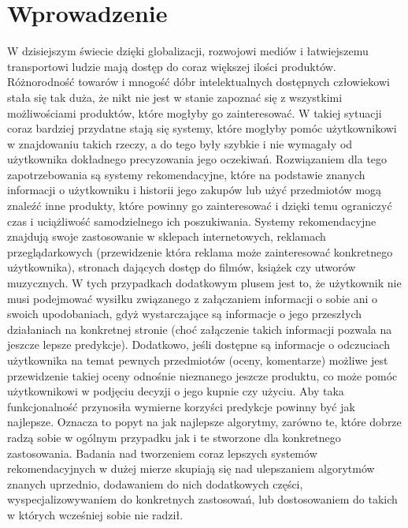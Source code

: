 \documentclass{pracamgr}
\begin{document}
 \chapter*{Wprowadzenie}
  W dzisiejszym świecie dzięki globalizacji, rozwojowi mediów i łatwiejszemu transportowi ludzie mają dostęp do coraz większej ilości produktów. 
  Różnorodność towarów i mnogość dóbr intelektualnych dostępnych człowiekowi stała się tak duża, że nikt nie jest w stanie zapoznać się z wszystkimi
  możliwościami produktów, które mogłyby go zainteresować. W takiej sytuacji coraz bardziej przydatne stają się systemy, które mogłyby pomóc użytkownikowi
  w znajdowaniu takich rzeczy, a do tego były szybkie i nie wymagały od użytkownika dokładnego precyzowania jego oczekiwań.
  Rozwiązaniem dla tego zapotrzebowania są systemy rekomendacyjne, które na podstawie znanych informacji o użytkowniku
  i historii jego zakupów lub użyć przedmiotów mogą znaleźć inne produkty, które powinny go zainteresować i dzięki temu ograniczyć czas i uciążliwość
  samodzielnego ich poszukiwania.\newline
  Systemy rekomendacyjne znajdują swoje zastosowanie w sklepach internetowych, reklamach przeglądarkowych
  (przewidzenie która reklama może zainteresować konkretnego użytkownika), stronach dających dostęp do filmów, książek czy utworów muzycznych.
  W tych przypadkach dodatkowym plusem jest to, że użytkownik nie musi podejmować wysiłku związanego z załączaniem informacji o sobie ani
  o swoich upodobaniach, gdyż wystarczające są informacje o jego przeszłych działaniach na konkretnej stronie
  (choć załączenie takich informacji pozwala na jeszcze lepsze predykcje). Dodatkowo, jeśli dostępne są informacje o odczuciach użytkownika
  na temat pewnych przedmiotów (oceny, komentarze) możliwe jest przewidzenie takiej oceny odnośnie nieznanego jeszcze produktu, co może pomóc użytkownikowi
  w podjęciu decyzji o jego kupnie czy użyciu.\newline
  Aby taka funkcjonalność przynosiła wymierne korzyści predykcje powinny być jak najlepsze. Oznacza to popyt na jak najlepsze algorytmy,
  zarówno te, które dobrze radzą sobie w ogólnym przypadku jak i te stworzone dla konkretnego zastosowania.\newline
  Badania nad tworzeniem coraz lepszych systemów rekomendacyjnych w dużej mierze skupiają się nad ulepszaniem algorytmów znanych
  uprzednio, dodawaniem do nich dodatkowych części, wyspecjalizowywaniem do konkretnych zastosowań,
  lub dostosowaniem do takich w których wcześniej sobie nie radził.\newline
  
\end{document}
